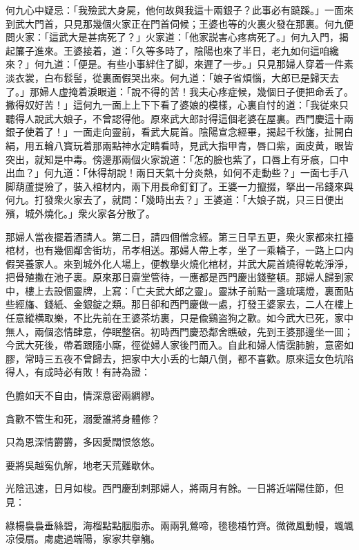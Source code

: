 何九心中疑忌：「我殮武大身屍，他何故與我這十兩銀子？此事必有蹺蹊。」一面來到武大門首，只見那幾個火家正在門首伺候；王婆也等的火裏火發在那裏。何九便問火家：「這武大是甚病死了？」火家道：「他家説害心疼病死了。」何九入門，揭起簾子進來。王婆接着，道：「久等多時了，陰陽也來了半日，老九如何這咱纔來？」何九道：「便是。有些小事絆住了脚，來遲了一步。」只見那婦人穿着一件素淡衣裳，白布䯼髻，從裏面假哭出來。何九道：「娘子省煩惱，大郎已是歸天去了。」那婦人虚掩着淚眼道：「說不得的苦！我夫心疼症候，幾個日子便把命丢了。撇得奴好苦！」這何九一面上上下下看了婆娘的模樣，心裏自忖的道：「我従來只聽得人說武大娘子，不曾認得他。原來武大郎討得這個老婆在屋裏。西門慶這十兩銀子使着了！」一面走向靈前，看武大屍首。陰陽宣念經畢，揭起千秋旛，扯開白絹，用五輪八寳玩着那兩點神水定睛看時，見武大指甲青，唇口紫，面皮黄，眼皆突出，就知是中毒。傍邊那兩個火家說道：「怎的臉也紫了，口唇上有牙痕，口中出血？」何九道：「休得胡說！兩日天氣十分炎熱，如何不走動些？」一面七手八脚葫蘆提殮了，裝入棺材内，兩下用長命釘釘了。王婆一力攛掇，拏出一吊錢來與何九。打發衆火家去了，就問：「幾時出去？」王婆道：「大娘子説，只三日便出殯，城外燒化。」衆火家各分散了。

那婦人當夜擺着酒請人。第二日，請四個僧念經。第三日早五更，衆火家都來扛擡棺材，也有幾個鄰舍街坊，吊孝相送。那婦人帶上孝，坐了一乘轎子，一路上口内假哭養家人。來到城外化人場上，便教擧火燒化棺材，并武大屍首燒得乾乾淨淨，把骨殖撒在池子裏。原來那日齋堂管待，一應都是西門慶出錢整頓。那婦人歸到家中，樓上去設個靈牌，上寫：「亡夫武大郎之靈」。靈牀子前點一盞琉璃燈，裏面貼些經旛、錢紙、金銀錠之類。那日卻和西門慶做一處，打發王婆家去，二人在樓上任意縱横取樂，不比先前在王婆茶坊裏，只是偸鷄盗狗之歡。如今武大已死，家中無人，兩個恣情肆意，停眠整宿。初時西門慶恐鄰舍瞧破，先到王婆那邊坐一囬；今武大死後，帶着跟隨小廝，徑從婦人家後門而入。自此和婦人情霑肺腑，意密如膠，常時三五夜不曾歸去，把家中大小丢的七顛八倒，都不喜歡。原來這女色坑陷得人，有成時必有敗！有詩為證：

\begin{myquote}
色膽如天不自由，情深意密兩綢繆。

貪歡不管生和死，溺愛誰將身體修？

只為恩深情欝欝，多因愛闊恨悠悠。

要將吳越寃仇解，地老天荒難歇休。
\end{myquote}

光陰迅速，日月如梭。西門慶刮剌那婦人，將兩月有餘。一日將近端陽佳節，但見：
\begin{myquote}
綠楊裊裊垂絲碧，海榴點點胭脂赤。兩兩乳鶯啼，毶毶梧竹齊。微微風動幔，颯颯凉侵扇。䖏處過端陽，家家共擧觴。
\end{myquote}

